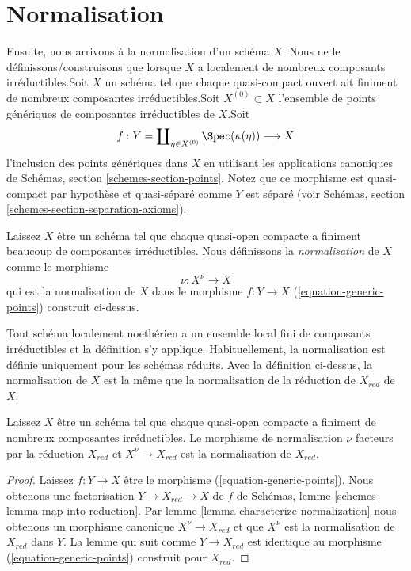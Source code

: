 \section{Normalisation}
\label{section-normalization}

\noindent
Ensuite, nous arrivons à la normalisation d'un schéma $X$. Nous ne le définissons/construisons que lorsque $X$ a localement de nombreux composants irréductibles.Soit $X$ un schéma tel que chaque quasi-compact ouvert ait finiment de nombreux composantes irréductibles.Soit $X^{(0)} \subset X$ l'ensemble de points génériques de composantes irréductibles de $X$.Soit
\begin{equation}
\label{equation-generic-points}
f :
Y = \coprod\nolimits_{\eta \in X^{(0)}} \Spec(\kappa(\eta))
\longrightarrow
X
\end{equation}
l'inclusion des points génériques dans $X$ en utilisant les applications canoniques de Schémas, section \ref{schemes-section-points}. Notez que ce morphisme est quasi-compact par hypothèse et quasi-séparé comme $Y$ est séparé (voir Schémas, section \ref{schemes-section-separation-axioms}).

\begin{definition}

\label{definition-normalization}
Laissez $X$ être un schéma tel que chaque quasi-open compacte a finiment beaucoup de composantes irréductibles. Nous définissons la {\it normalisation} de $X$ comme le morphisme $$
\nu : X^\nu \longrightarrow X
$$ qui est la normalisation de $X$ dans le morphisme $f : Y \to X$ (\ref{equation-generic-points}) construit ci-dessus.
\end{definition}

\noindent
Tout schéma localement noethérien a un ensemble local fini de composants irréductibles et la définition s'y applique. Habituellement, la normalisation est définie uniquement pour les schémas réduits. Avec la définition ci-dessus, la normalisation de $X$ est la même que la normalisation de la réduction de $X_{red}$ de $X$.

\begin{lemma}

\label{lemma-normalization-reduced}
Laissez $X$ être un schéma tel que chaque quasi-open compacte a finiment de nombreux composantes irréductibles. Le morphisme de normalisation $\nu$ facteurs par la réduction $X_{red}$ et $X^\nu \to X_{red}$ est la normalisation de $X_{red}$.
\end{lemma}

\begin{proof}
Laissez $f : Y \to X$ être le morphisme (\ref{equation-generic-points}). Nous obtenons une factorisation $Y \to X_{red} \to X$ de $f$ de Schémas, lemme \ref{schemes-lemma-map-into-reduction}. Par lemme \ref{lemma-characterize-normalization} nous obtenons un morphisme canonique $X^\nu \to X_{red}$ et que $X^\nu$ est la normalisation de $X_{red}$ dans $Y$. La lemme qui suit comme $Y \to X_{red}$ est identique au morphisme (\ref{equation-generic-points}) construit pour $X_{red}$.
\end{proof}

